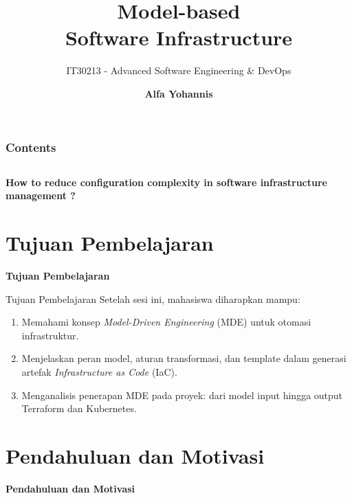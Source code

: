 \documentclass[aspectratio=169, table]{beamer}
\subtitle{IT30213 - Advanced Software Engineering \& DevOps}
\title{\Huge Model-based\\\vspace{8pt}
	Software Infrastructure\vspace{5pt}}
\author{\textbf{Alfa Yohannis}}
\begin{document}
\frame{\titlepage}

\begin{frame}[fragile]
	\frametitle{Contents}
	\vspace{20pt}
	\begin{columns}[t]
		\tableofcontents[sections={1-5}]

		\tableofcontents[sections={6-20}]
	\end{columns}
\end{frame}

\begin{frame}{\hfill}
	\centering
	\Huge{\textbf{How to reduce configuration complexity 
  in software infrastructure management
  ?}}
\end{frame}

\section{Tujuan Pembelajaran}
\begin{frame}{\hfill}
	\centering
	\Huge{\textbf{Tujuan Pembelajaran}}
\end{frame}

\begin{frame}{Tujuan Pembelajaran}
\vspace{10pt}
Setelah sesi ini, mahasiswa diharapkan mampu:
\begin{enumerate}
  \item Memahami konsep \textit{Model-Driven Engineering} (MDE) untuk otomasi infrastruktur.
  \item Menjelaskan peran model, aturan transformasi, dan template dalam generasi artefak \textit{Infrastructure as Code} (IaC).
  \item Menganalisis penerapan MDE pada proyek: dari model input hingga output Terraform dan Kubernetes.
\end{enumerate}
\end{frame}

\section{Pendahuluan dan Motivasi}
\begin{frame}{\hfill}
	\centering
	\Huge{\textbf{Pendahuluan dan Motivasi}}
\end{frame}
\end{document}
